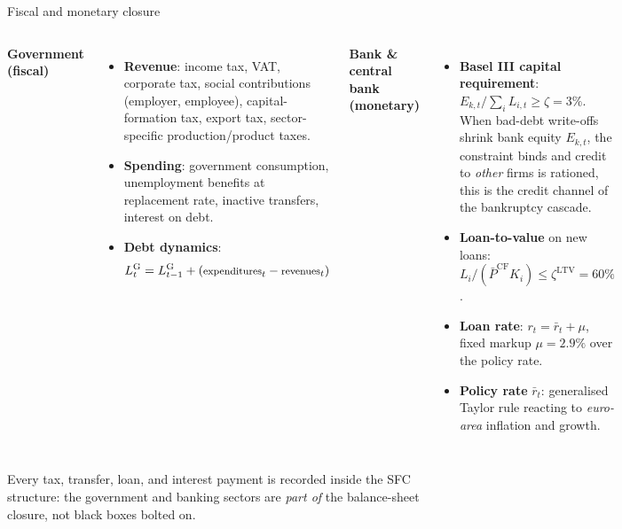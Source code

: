 \documentclass[9pt]{beamer}
\begin{document}
\begin{frame}{Fiscal and monetary closure}
    \begin{columns}[T]
    \textbf{Government (fiscal)}
    \begin{itemize}\footnotesize
        \item \textbf{Revenue}: income tax, VAT, corporate tax, social contributions (employer, employee), capital-formation tax, export tax, sector-specific production/product taxes.
        \item \textbf{Spending}: government consumption, unemployment benefits at replacement rate, inactive transfers, interest on debt.
        \item \textbf{Debt dynamics}:
        \begin{equation*}\footnotesize
            L^{\mathrm{G}}_t = L^{\mathrm{G}}_{t-1} + (\text{expenditures}_t - \text{revenues}_t)
        \end{equation*}
    \end{itemize}

    \textbf{Bank \& central bank (monetary)}
    \begin{itemize}\footnotesize
        \item \textbf{Basel III capital requirement}:
        $E_{k,t}/\sum_i L_{i,t} \geq \zeta = 3\%$. When bad-debt write-offs shrink bank equity $E_{k,t}$, the constraint binds and credit to \emph{other} firms is rationed, this is the credit channel of the bankruptcy cascade.
        \item \textbf{Loan-to-value} on new loans: $L_i/(\bar{P}^{\mathrm{CF}} K_i) \leq \zeta^{\mathrm{LTV}} = 60\%$.
        \item \textbf{Loan rate}: $r_t = \bar{r}_t + \mu$, fixed markup $\mu = 2.9\%$ over the policy rate.
        \item \textbf{Policy rate} $\bar{r}_t$: generalised Taylor rule reacting to \emph{euro-area} inflation and growth.
    \end{itemize}
    \end{columns}
    \vspace{0.4em}
    \footnotesize
    Every tax, transfer, loan, and interest payment is recorded inside the SFC structure: the government and banking sectors are \emph{part of} the balance-sheet closure, not black boxes bolted on.
\end{frame}
\end{document}
